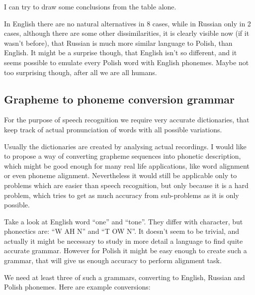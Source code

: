 \documentclass[12pt,a4paper,english]{article}
\begin{document}
I can try to draw some conclusions from the table alone. \newline

In English there are no natural alternatives in 8 cases, while in Russian only in 2 cases, although there are some other dissimilarities, it is clearly visible now (if it wasn't before), that Russian is much more similar language to Polish, than English. \newline
It might be a surprise though, that English isn't so different, and it seems possible to emulate every Polish word with English phonemes.
Maybe not too surprising though, after all we are all humans.

\newpage
\subsection{Grapheme to phoneme conversion grammar}

For the purpose of speech recognition we require very accurate dictionaries, that keep track of actual pronunciation of words with all possible variations. \newline

Usually the dictionaries are created by analysing actual recordings. \newline
I would like to propose a way of converting grapheme sequences into phonetic description, which might be good enough for many real life applications, like word alignment or even phoneme alignment. \newline
Nevertheless it would still be applicable only to problems which are easier than speech recognition, but only because it is a hard problem, which tries to get as much accuracy from sub-problems as it is only possible. \newline

Take a look at English  word “one” and “tone”. They differ with character, but phonectics are: “W AH N”  and “T OW N”.  \newline
It doesn't seem to be trivial, and actually it might be necessary to study in more detail a language to find quite accurate grammar. However for Polish it might be easy enough to create such a grammar, that will give us enough accuracy to perform alignment task. \newline

We need at least three of such a grammars, converting to English, Russian and Polish phonemes. \newline
 Here are example conversions:
\end{document}
